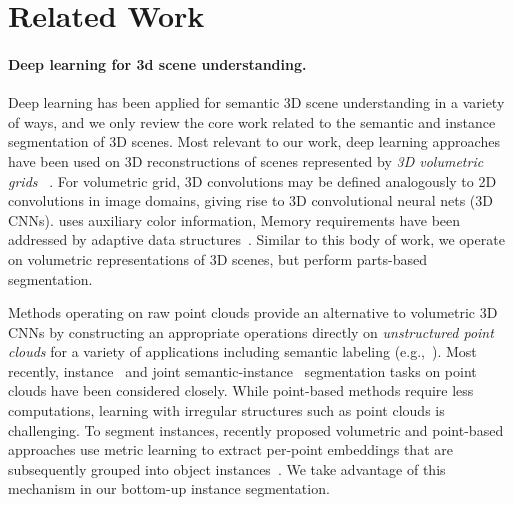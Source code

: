 \section{Related Work}
\label{sec:related}

\paragraph{Deep learning for 3d scene understanding.}
\label{related:scene-understanding}
Deep learning has been applied for semantic 3D scene understanding in a variety of ways, and we only review the core work related to the semantic and instance segmentation of 3D scenes. 
Most relevant to our work, deep learning approaches have been used on 3D reconstructions of scenes represented by \emph{3D volumetric grids} ~\cite{dai2017scannet,dai20183dmv,hou20193d,liu2019masc}. For volumetric grid, 3D convolutions may be defined analogously to 2D convolutions in image domains, giving rise to 3D convolutional neural nets (3D CNNs).
\cite{dai20183dmv} uses auxiliary color information, 
Memory requirements have been addressed by adaptive data structures~\cite{wang2017cnn}.
Similar to this body of work, we operate on volumetric representations of 3D scenes, but perform parts-based segmentation. %

Methods operating on raw point clouds provide an alternative to volumetric 3D CNNs by constructing an appropriate operations directly on \emph{unstructured point clouds} for a variety of applications including semantic labeling (e.g.,~\cite{qi2017pointnet,qi2017pointnet++,klokov2017escape,wang2018sgpn,wang2019dynamic}). Most recently, instance~\cite{elich20193d,liang20193d,elich20193d,yi2019gspn,yang2019learning,zhang2019point,engelmann20203d} and joint semantic-instance~\cite{wang2019associatively,pham2019jsis3d} segmentation tasks on point clouds have been considered closely. While point-based methods require less computations, learning with irregular structures such as point clouds is challenging.
To segment instances, recently proposed volumetric and point-based approaches use metric learning  to extract per-point embeddings that are subsequently grouped into object instances~\cite{elich20193d,yi2019gspn,lahoud20193d,liu2019masc}. We take advantage of this mechanism in our bottom-up instance segmentation.


